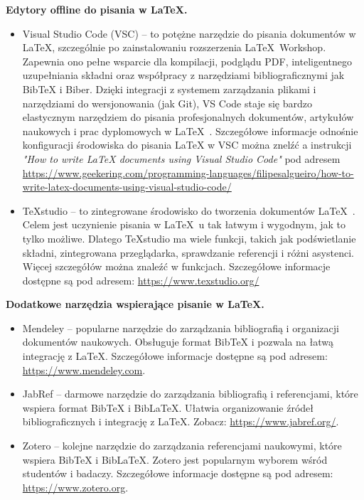 \noindent \textbf{Edytory offline do pisania w LaTeX.}

\begin{itemize}
      \item Visual Studio Code (VSC) -- to potężne narzędzie do pisania dokumentów w \LaTeX, szczególnie po zainstalowaniu rozszerzenia \LaTeX~Workshop. Zapewnia ono pełne wsparcie dla kompilacji, podglądu PDF, inteligentnego uzupełniania składni oraz współpracy z narzędziami bibliograficznymi jak BibTeX i Biber. Dzięki integracji z systemem zarządzania plikami i narzędziami do wersjonowania (jak Git), VS Code staje się bardzo elastycznym narzędziem do pisania profesjonalnych dokumentów, artykułów naukowych i prac dyplomowych w \LaTeX~. Szczegółowe informacje odnośnie konfiguracji środowiska do pisania LaTeX w VSC można znelźć a instrukcji \textit{"How to write LaTeX documents using Visual Studio Code"} pod adresem \url{https://www.geekering.com/programming-languages/filipesalgueiro/how-to-write-latex-documents-using-visual-studio-code/}
      \item TeXstudio -- to zintegrowane środowisko do tworzenia dokumentów \LaTeX~. Celem jest uczynienie pisania w \LaTeX~u tak łatwym i wygodnym, jak to tylko możliwe. Dlatego TeXstudio ma wiele funkcji, takich jak podświetlanie składni, zintegrowana przeglądarka, sprawdzanie referencji i różni asystenci. Więcej szczegółów można znaleźć w funkcjach. Szczegółowe informacje dostępne są pod adresem: \url{https://www.texstudio.org/}
\end{itemize}

\noindent \textbf{Dodatkowe narzędzia wspierające pisanie w LaTeX.}
\begin{itemize}
      \item Mendeley -- popularne narzędzie do zarządzania bibliografią i organizacji dokumentów naukowych. Obsługuje format BibTeX i pozwala na łatwą integrację z LaTeX. Szczegółowe informacje dostępne są pod adresem: \url{https://www.mendeley.com}.
      \item JabRef -- darmowe narzędzie do zarządzania bibliografią i referencjami, które wspiera format BibTeX i BibLaTeX. Ułatwia organizowanie źródeł bibliograficznych i integrację z LaTeX. Zobacz: \url{https://www.jabref.org/}.
      \item Zotero -- kolejne narzędzie do zarządzania referencjami naukowymi, które wspiera BibTeX i BibLaTeX. Zotero jest popularnym wyborem wśród studentów i badaczy. Szczegółowe informacje dostępne są pod adresem: \url{https://www.zotero.org}.
\end{itemize}

